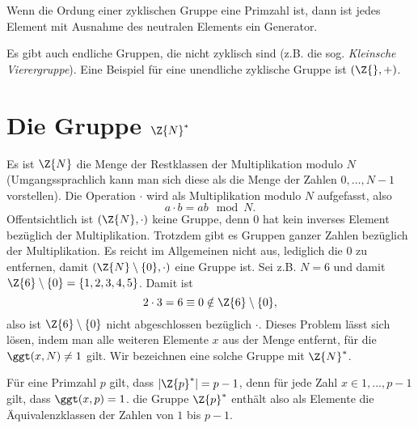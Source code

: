 \begin{theorem} 
Wenn die Ordung einer zyklischen Gruppe eine Primzahl ist, dann ist
jedes Element mit Ausnahme des neutralen Elements ein Generator. 
\end{theorem}

Es gibt auch endliche Gruppen, die nicht zyklisch sind (z.B. die
sog. \emph{Kleinsche Vierergruppe}). Eine Beispiel für eine unendliche
zyklische Gruppe ist $(\Z{}, + )$.
\section{Die Gruppe $\Z{N}^*$}
Es ist $\Z{N}$ die Menge der Restklassen der Multiplikation modulo $N$
(Umgangssprachlich kann man sich diese als die Menge der Zahlen
${0,\dots , N-1}$ vorstellen). Die Operation $\cdot$ wird als
Multiplikation modulo $N$ aufgefasst, also 
\[
a \cdot b = ab \mod N.
\]
 Offentsichtlich
ist $(\Z{N}, \cdot)$ keine Gruppe, denn $0$ hat kein inverses Element
bezüglich der Multiplikation.
Trotzdem gibt es Gruppen ganzer Zahlen bezüglich der
Multiplikation. Es reicht im Allgemeinen nicht aus, lediglich die $0$ zu
entfernen, damit $(\Z{N}\setminus \{0\}, \cdot)$ eine Gruppe ist. Sei
z.B. $N=6$ und damit $\Z{6}\setminus \{0\} = \{1,2,3,4,5\}$. Damit ist  
\[
2 \cdot 3 = 6 \equiv 0 \notin \Z{6}\setminus \{0\},
\]
also ist $\Z{6}\setminus \{0\}$ nicht abgeschlossen bezüglich $\cdot$. 
Dieses Problem lässt sich lösen, indem man alle weiteren Elemente $x$ aus
der Menge entfernt, für die $\ggt(x, N)\neq 1$ gilt. Wir bezeichnen eine
solche Gruppe mit $\Z{N}^*$. 

Für eine Primzahl $p$ gilt, dass  $|\Z{p}^*|= p-1$, denn für jede Zahl $x\in
{1,..., p-1}$ gilt, dass $\ggt(x, p)=1$. die Gruppe $\Z{p}^*$ enthält
also als Elemente die Äquivalenzklassen der Zahlen von $1$ bis $p-1$.

